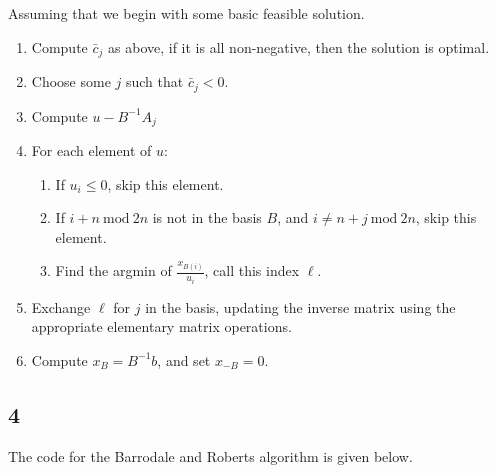 \documentclass[12pt]{paper}
\newcommand{\Mod}[1]{\ \mathrm{mod}\ #1}
\newcommand{\inv}[1]{{#1}^{-1}}
\begin{document}
Assuming that we begin with some basic feasible solution.
\begin{enumerate}
\item Compute $\bar{c}_j$ as above, if it is all non-negative, then
  the solution is optimal.
\item Choose some $j$ such that $\bar{c}_j < 0$.
\item Compute $u - \inv{B} A_j$
\item For each element of $u$:
  \begin{enumerate}
  \item If $u_i \leq 0$, skip this element.
  \item If $i + n \Mod 2n$ is not in the basis $B$, and $i \neq n+j \Mod
    2n$, skip this element.
    
  \item Find the argmin of $\frac{x_{B(i)}}{u_i}$, call this index
    $\ell$.
  \end{enumerate}
  
\item Exchange $\ell$ for $j$ in the basis, updating the inverse matrix
  using the appropriate elementary matrix operations.
\item Compute $x_B = \inv{B} b$, and set $x_{-B} = 0$.
\end{enumerate}

\subsection{4}

The code for the Barrodale and Roberts algorithm is given below.
\end{document}
